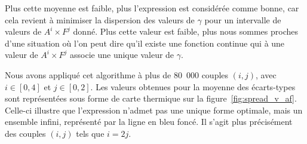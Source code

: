 	Plus cette moyenne est faible, plus l'expression est considérée comme bonne, car cela revient à minimiser la dispersion des valeurs de $\gamma$ pour un intervalle de valeurs de $A^{i}\times{}F^{j}$ donné. Plus cette valeur est faible, plus nous sommes proches d'une situation où l'on peut dire qu'il existe une fonction continue qui à une valeur de $A^{i}\times{}F^{j}$ associe une unique valeur de $\gamma$.
	
	Nous avons appliqué cet algorithme à plus de 80~000 couples $(i,j)$, avec $i \in [0,4]$ et $j \in [0,2]$. Les valeurs obtenues pour la moyenne des écarts-types sont représentées sous forme de carte thermique sur la figure~\ref{fig:spread_v_af}. Celle-ci illustre que l'expression n'admet pas une unique forme optimale, mais un ensemble infini, représenté par la ligne en bleu foncé. Il s'agit plus précisément des couples $(i,j)$ tels que $i = 2j$.

